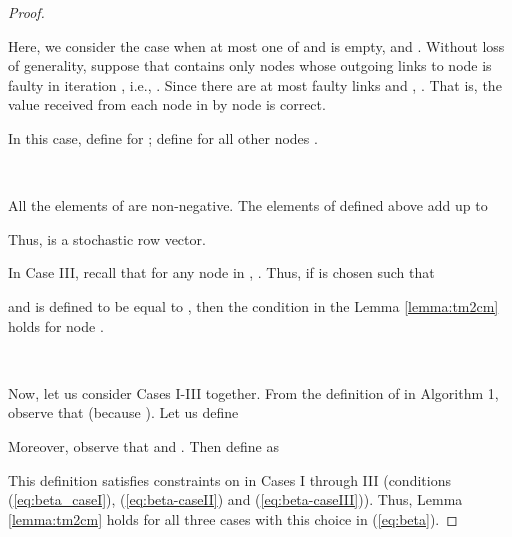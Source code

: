 \documentclass{llncs}
\newcommand{\fillbox}{\hspace*{\fill}}
\begin{document}
\begin{proof}
~







Here, we consider the case when at most one of  and  is empty, and . Without loss of generality, suppose that  contains only nodes whose outgoing links to node  is faulty in iteration , i.e., . Since there are at most  faulty links and , . That is, the value received from each node in  by node  is correct.

In this case, define  for ;
define  for all other nodes .


~



All the elements of  are non-negative.
The elements of  defined above add up to

Thus,  is a stochastic row vector.

In Case III, recall that for any node  in , .
Thus, if  is chosen such that

and  is defined to be equal to ,
then the condition in the
Lemma \ref{lemma:tm2cm} holds for node . 

~



Now, let us consider Cases I-III together. From the definition of  in Algorithm 1, observe that  (because ). Let us define

Moreover, observe that  and . Then define  as 

This definition satisfies constraints on  in Cases I through III (conditions (\ref{eq:beta_caseI}), (\ref{eq:beta-caseII}) and (\ref{eq:beta-caseIII})). Thus, Lemma \ref{lemma:tm2cm} holds for all three cases with this choice in (\ref{eq:beta}).

\fillbox
\end{proof}
\end{document}
